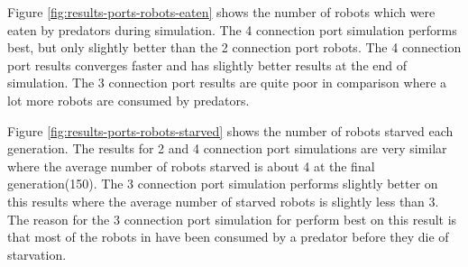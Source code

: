 \vspace*{\fill}
\newpage
\vspace*{\fill}


Figure \ref{fig:results-ports-robots-eaten} shows the number of robots which were eaten by predators during simulation.
The 4 connection port simulation performs best, but only slightly better than the 2 connection port robots.
The 4 connection port results converges faster and has slightly better results at the end of simulation.
The 3 connection port results are quite poor in comparison where a lot more robots are consumed by predators.

\vspace*{\fill}
\newpage
\vspace*{\fill}



Figure \ref{fig:results-ports-robots-starved} shows the number of robots starved each generation.
The results for 2 and 4 connection port simulations are very similar where the average number of robots starved is about 4 at the final generation(150).
The 3 connection port simulation performs slightly better on this results where the average number of starved robots is slightly less than 3.
The reason for the 3 connection port simulation for perform best on this result is that most of the robots in have been consumed by a predator before they die of starvation.

\vspace*{\fill}
\newpage
\vspace*{\fill}



